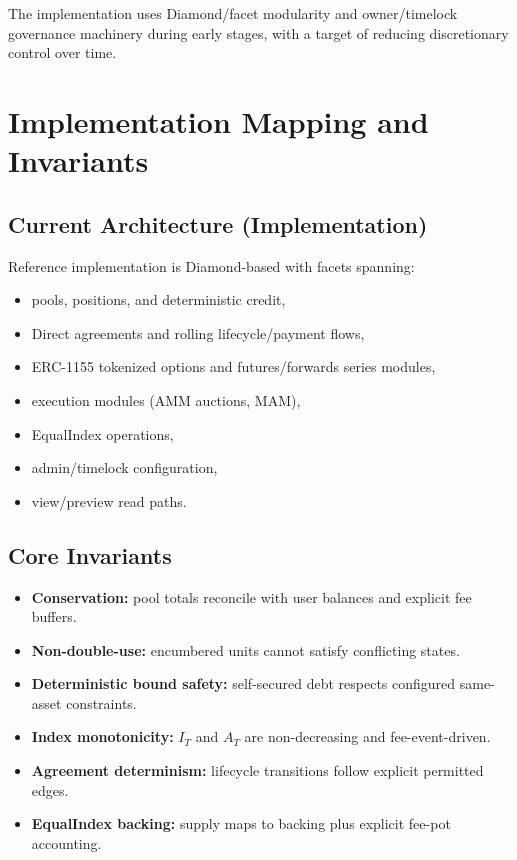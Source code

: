 \documentclass[version=preprint]{iacrcc}
\begin{document}
The implementation uses Diamond/facet modularity and owner/timelock governance machinery during early stages, with a target of reducing discretionary control over time.

\section{Implementation Mapping and Invariants}

\subsection{Current Architecture (Implementation)}

Reference implementation is Diamond-based with facets spanning:
\begin{itemize}
  \item pools, positions, and deterministic credit,
  \item Direct agreements and rolling lifecycle/payment flows,
  \item ERC-1155 tokenized options and futures/forwards series modules,
  \item execution modules (AMM auctions, MAM),
  \item EqualIndex operations,
  \item admin/timelock configuration,
  \item view/preview read paths.
\end{itemize}

\subsection{Core Invariants}

\begin{itemize}
  \item \textbf{Conservation:} pool totals reconcile with user balances and explicit fee buffers.
  \item \textbf{Non-double-use:} encumbered units cannot satisfy conflicting states.
  \item \textbf{Deterministic bound safety:} self-secured debt respects configured same-asset constraints.
  \item \textbf{Index monotonicity:} $I_T$ and $A_T$ are non-decreasing and fee-event-driven.
  \item \textbf{Agreement determinism:} lifecycle transitions follow explicit permitted edges.
  \item \textbf{EqualIndex backing:} supply maps to backing plus explicit fee-pot accounting.
\end{itemize}
\end{document}
